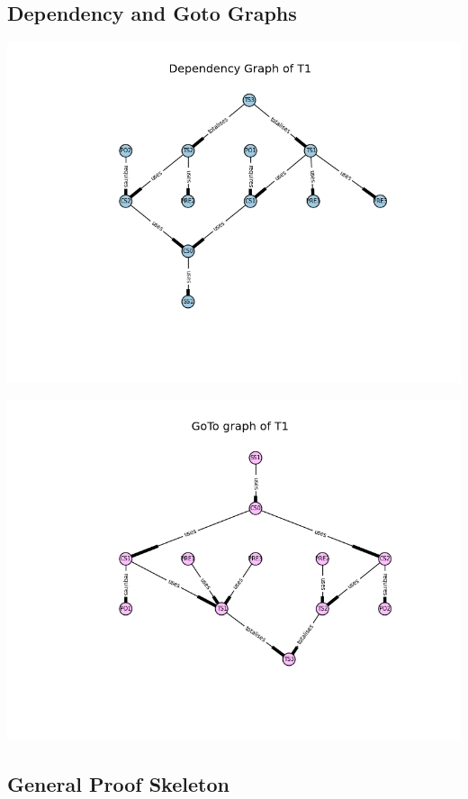\subsection{Dependency and Goto Graphs}
\label{app:vm2.5}
\includegraphics[scale=0.7]{examples/vm/25a.png}

\includegraphics[scale=0.7]{examples/vm/25b.png}
\subsection{General Proof Skeleton}
\label{app:vm3}


